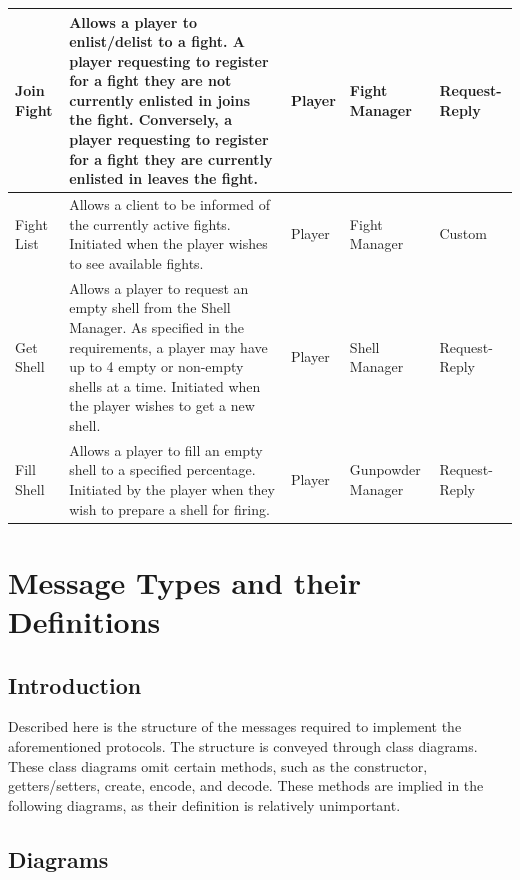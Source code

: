 \documentclass[12pt]{article}
\begin{document}
\begin{center}
\begin{supertabular}{|p{2cm}|p{5cm}|p{2cm}|p{2.5cm}|l|}
		        	Join Fight & Allows a player to enlist/delist to a fight. A player requesting to register for a fight they are not currently enlisted in joins the fight. Conversely, a player requesting to register for a fight they are currently enlisted in leaves the fight. & Player & Fight Manager & Request-Reply \\ \hline
						Fight List & Allows a client to be informed of the currently active fights. Initiated when the player wishes to see available fights.& Player & Fight Manager & Custom \\ \hline
		        	
		        	Get Shell & Allows a player to request an empty shell from the Shell Manager. As specified in the requirements, a player may have up to 4 empty or non-empty shells at a time. Initiated when the player wishes to get a new shell.& Player & Shell Manager & Request-Reply \\ \hline
		        	Fill Shell & Allows a player to fill an empty shell to a specified percentage. Initiated by the player when they wish to prepare a shell for firing.& Player & Gunpowder Manager & Request-Reply \\ \hline
				\hline
		    \end{supertabular}
		\end{center}
		
\section{Message Types and their Definitions}
		\subsection{Introduction}
			Described here is the structure of the messages required to implement the aforementioned protocols. The structure is conveyed through class diagrams. These class diagrams omit certain methods, such as the constructor, getters/setters, create, encode, and decode. These methods are implied in the following diagrams, as their definition is relatively unimportant.
		\subsection{Diagrams}
			\newpage
\end{document}
